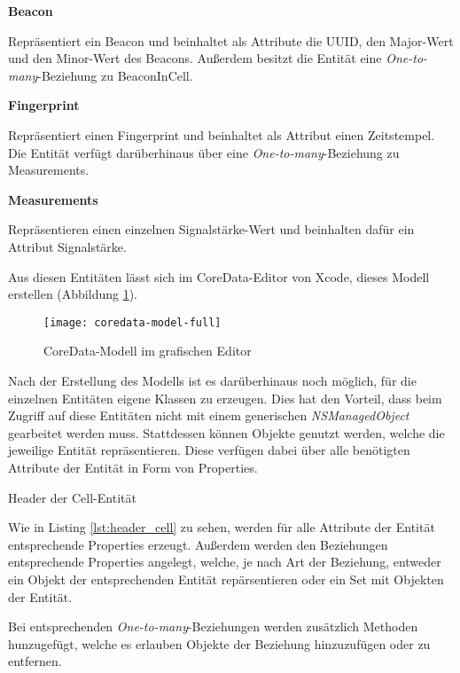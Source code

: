 \textbf{Beacon}

Repräsentiert ein Beacon und beinhaltet als Attribute die UUID, den Major-Wert und den Minor-Wert des Beacons.
Außerdem besitzt die Entität eine \emph{One-to-many}-Beziehung zu BeaconInCell.

\textbf{Fingerprint}

Repräsentiert einen Fingerprint und beinhaltet als Attribut einen Zeitstempel.
Die Entität verfügt darüberhinaus über eine \emph{One-to-many}-Beziehung zu Measurements.


\textbf{Measurements}

Repräsentieren einen einzelnen Signalstärke-Wert und beinhalten dafür ein Attribut Signalstärke.



Aus diesen Entitäten lässt sich im CoreData-Editor von Xcode, dieses Modell erstellen (Abbildung \ref{coredata-model-full}).

\begin{figure}[htb!]
		\centering
	\texttt{[image: coredata-model-full]}
	\caption{CoreData-Modell im grafischen Editor}
	\label{coredata-model-full}
\end{figure}


Nach der Erstellung des Modells ist es darüberhinaus noch möglich, für die einzelnen Entitäten eigene Klassen zu erzeugen. Dies hat den Vorteil, dass beim Zugriff auf diese Entitäten nicht mit einem generischen \emph{NSManagedObject} gearbeitet werden muss. Stattdessen können Objekte genutzt werden, welche die jeweilige Entität repräsentieren. Diese verfügen dabei über alle benötigten Attribute der Entität in Form von Properties.

\begin{listing}[htb! breaklines=true]
    \caption{Header der Cell-Entität}
	\label{lst:header_cell}
\end{listing}

Wie in Listing \ref{lst:header_cell} zu sehen, werden für alle Attribute der Entität entsprechende Properties erzeugt. Außerdem werden den Beziehungen entsprechende Properties angelegt, welche, je nach Art der Beziehung, entweder ein Objekt der entsprechenden Entität repärsentieren oder ein Set mit Objekten der Entität.

Bei entsprechenden \emph{One-to-many}-Beziehungen werden zusätzlich Methoden hunzugefügt, welche es erlauben Objekte der Beziehung hinzuzufügen oder zu entfernen.


